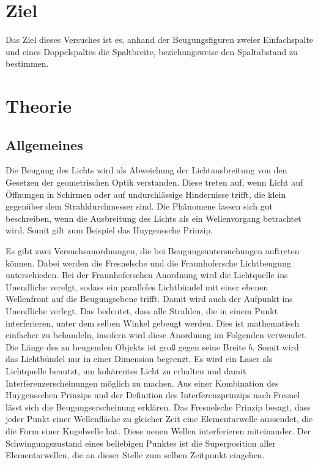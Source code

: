 \section{Ziel}
Das Ziel dieses Versuches ist es, anhand der Beugungsfiguren
zweier Einfachspalte und eines Doppelspaltes die Spaltbreite,
beziehungsweise den Spaltabstand zu bestimmen.

\section{Theorie}
\label{sec:Theorie}

\subsection{Allgemeines}
Die Beugung des Lichts wird als Abweichung der 
Lichtausbreitung von den Gesetzen der geometrischen Optik 
verstanden. Diese treten auf, wenn Licht auf Öffnungen in 
Schirmen oder auf undurchlässige Hindernisse trifft, die klein
gegenüber dem Strahldurchmesser sind. Die 
Phänomene lassen sich gut beschreiben, wenn die 
Ausbreitung des Lichts als ein Wellenvorgang betrachtet wird. 
Somit gilt zum Beispiel das Huygenssche Prinzip. %

\noindent Es gibt zwei Versuchsanordnungen, die bei Beugungsuntersuchungen 
auftreten können. Dabei werden die Fresnelsche und die 
Fraunhofersche Lichtbeugung unterschieden. Bei der 
Fraunhoferschen Anordnung wird die Lichtquelle ins Unendliche 
verelgt, sodass ein paralleles Lichtbündel mit einer ebenen 
Wellenfront auf die Beugungsebene trifft. Damit wird auch der Aufpunkt 
ins Unendliche  verlegt. Das bedeutet, dass alle Strahlen, die 
in einem Punkt interferieren, unter dem selben Winkel gebeugt 
werden. Dies ist mathematisch einfacher zu behandeln, insofern 
wird diese Anordnung im Folgenden verwendet. 
\newline
Die Länge des zu beugenden Objekts ist groß gegen seine 
Breite $b$. Somit wird das Lichtbündel nur in einer 
Dimension begrenzt.
\newline
Es wird ein Laser als Lichtquelle benutzt, um kohärentes Licht 
zu erhalten und damit Interferenzerscheinungen möglich zu machen. 
\newline
Aus einer Kombination des Huygensschen Prinzips und der 
Definition des Interferenzprinzips nach Fresnel lässt sich die 
Beugungserscheinung erklären. Das Fresnelsche Prinzip besagt, 
dass jeder Punkt einer Wellenfläche zu gleicher Zeit eine 
Elementarwelle aussendet, die die Form einer Kugelwelle hat. 
Diese neuen Wellen interferieren miteinander. Der 
Schwingungszustand eines beliebigen Punktes ist 
die Superposition aller Elementarwellen, die an dieser Stelle zum 
selben Zeitpunkt eingehen. 

